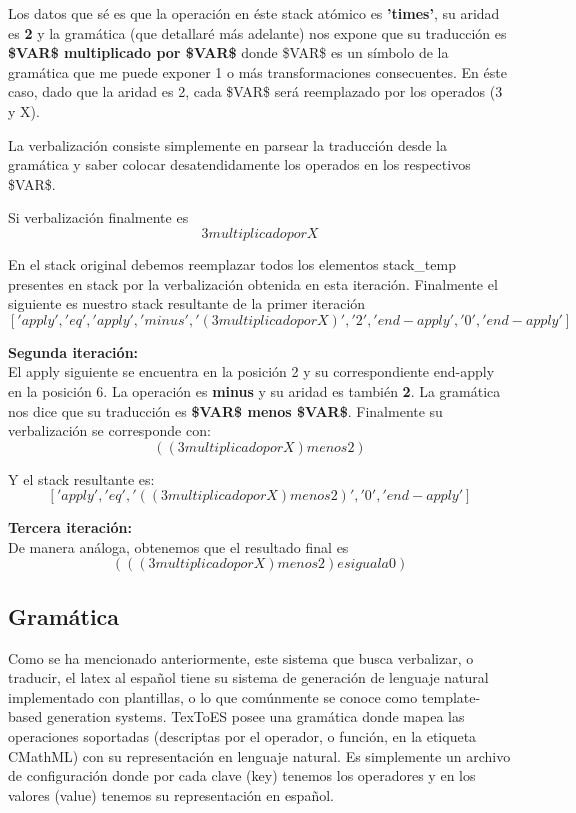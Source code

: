 Los datos que sé es que la operación en éste stack atómico es \textbf{'times'}, su aridad es \textbf{2} y la gramática (que detallaré más adelante) nos expone que su traducción es \textbf{\$VAR\$ multiplicado por \$VAR\$} donde \$VAR\$ es un símbolo de la gramática que me puede exponer 1 o más transformaciones consecuentes. En éste caso, dado que la aridad es 2, cada \$VAR\$ será reemplazado por los operados (3 y X).

La verbalización consiste simplemente en parsear la traducción desde la gramática y saber colocar desatendidamente los operados en los respectivos \$VAR\$.

Si verbalización finalmente es
$$3 multiplicado por X$$

En el stack original debemos reemplazar todos los elementos stack\_temp presentes en stack por la verbalización obtenida en esta iteración. Finalmente el siguiente es nuestro stack resultante de la primer iteración
$$['apply', 'eq', 'apply', 'minus', '(3 multiplicado por X)', '2', 'end-apply', '0', 'end-apply']$$

{\Large \textbf{Segunda iteración:\\}}
El apply siguiente se encuentra en la posición 2 y su correspondiente end-apply en la posición 6. La operación es \textbf{minus} y su aridad es también \textbf{2}. La gramática nos dice que su traducción es \textbf{\$VAR\$ menos \$VAR\$}. Finalmente su verbalización se corresponde con:
$$((3 multiplicado por X) menos 2)$$

Y el stack resultante es:
$$['apply', 'eq', '((3 multiplicado por X) menos 2)', '0', 'end-apply']$$

{\Large \textbf{Tercera iteración:\\}}
De manera análoga, obtenemos que el resultado final es
$$(((3 multiplicado por X) menos 2) es igual a 0)$$


\subsection{Gramática}

Como se ha mencionado anteriormente, este sistema que busca verbalizar, o traducir, el latex al español tiene su sistema
de generación de lenguaje natural implementado con plantillas, o lo que comúnmente se conoce como template-based generation systems.
TexToES posee una gramática donde mapea las operaciones soportadas (descriptas por el operador, o función, en la etiqueta CMathML) con su representación en lenguaje natural. Es simplemente un archivo de configuración donde por cada clave (key) tenemos los operadores y en los valores (value) tenemos su representación en español.\\

